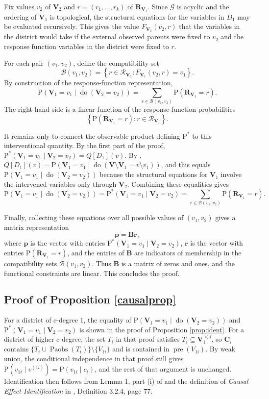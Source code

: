 \documentclass[12pt]{article}
\def\Pr{{\mathrm{P}}}
\def\Pdo{{\mathrm{P}^*}}
\DeclareMathOperator{\Paobs}{Paobs}
\newcommand{\bV}{\boldsymbol{V}}
\newcommand{\bR}{\boldsymbol{R}}
\DeclareMathOperator{\Do}{do}
\begin{document}
Fix values $v_2$ of $\bV_2$ and $r=(r_1,\ldots,r_k)$ of $\bR_{\bV_1}$.  Since $\mathcal{G}$ is acyclic and the ordering of $\bV_1$ is topological, the structural equations for the variables in $D_1$ may be evaluated recursively. This gives the value $F_{\bV_1}(v_2,r)$ that the variables in the district would take if the external observed parents were fixed to $v_2$ and the response function variables in the district were fixed to $r$.

For each pair $(v_1,v_2)$, define the compatibility set
\[
    \mathcal{B}(v_1,v_2)
    =
    \left\{
        r \in \mathcal{R}_{\bV_1}
        :
        F_{\bV_1}(v_2,r)=v_1
    \right\}.
\]
By construction of the response-function representation,
\[
    \Pr(\bV_1=v_1 \mid \Do(\bV_2=v_2))
    =
    \sum_{r\in \mathcal{B}(v_1,v_2)}
    \Pr(\bR_{\bV_1}=r).
\]
The right-hand side is a linear function of the response-function
probabilities
\[
    \left\{
        \Pr(\bR_{\bV_1}=r)
        :
        r\in\mathcal{R}_{\bV_1}
    \right\}.
\]

It remains only to connect the observable product defining $\Pdo$ to this interventional quantity. By the first part of the proof, $\Pdo(\bV_1=v_1\mid \bV_2=v_2) = Q[D_1](v)$. By \citet{tian2002identification}, $Q[D_1](v) = \Pr(\bV_1 = v_1 \mid \Do(\bV \setminus \bV_1 = v \setminus v_1))$, and this equals $\Pr(\bV_1 = v_1 \mid \Do(\bV_2 = v_2))$ because the structural equations for $\bV_1$ involve the intervened variables only through $\bV_2$.  Combining these equalities gives
\[
    \Pr(\bV_1=v_1\mid \Do(\bV_2=v_2)) = \Pdo(\bV_1=v_1\mid \bV_2=v_2) = \sum_{r\in \mathcal{B}(v_1,v_2)}
    \Pr(\bR_{\bV_1}=r).
\]

Finally, collecting these equations over all possible values of
$(v_1,v_2)$ gives a matrix representation
\[
    \boldsymbol{p} = \boldsymbol{B} \boldsymbol{r},
\]
where $\boldsymbol{p}$ is the vector with entries
$\Pdo(\bV_1=v_1\mid \bV_2=v_2)$, $\boldsymbol{r}$ is the vector with entries
$\Pr(\bR_{\bV_1}=r)$, and the entries of $\boldsymbol{B}$ are indicators of
membership in the compatibility sets $\mathcal{B}(v_1,v_2)$.  Thus
$\boldsymbol{B}$ is a matrix of zeros and ones, and the functional constraints are linear. This concludes the proof. 


\subsection*{Proof of Proposition \ref{causalprop}}
For a district of c-degree 1, the equality of $\Pr(\bV_1 = v_1 \mid \Do(\bV_2 = v_2))$ and $\Pdo(\bV_1 = v_1 \mid \bV_2 = v_2)$ is shown in the proof of Proposition \ref{prop:ident}. For a district of higher c-degree, the set $T_i$ in that proof satisfies $T_i \subseteq \bV_1^{\leq i}$, so $\boldsymbol{C}_i$ contains $\{T_i \cup \Paobs(T_i)\} \setminus \{V_{1i}\}$ and is contained in $\operatorname{pre}(V_{1i})$. By weak union, the conditional independence in that proof still gives $\Pr(v_{1i} \mid v^{(1i)}) = \Pr(v_{1i} \mid c_i)$, and the rest of that argument is unchanged. Identification then follows from Lemma 1, part (i) of \citet{tian2002identification} and the definition of \emph{Causal Effect Identification} in \citet{Pearl2000causality}, Definition 3.2.4, page 77.
\end{document}
